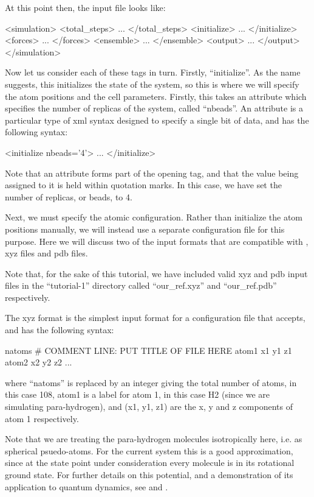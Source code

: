 \documentclass[11pt,english,fleqn]{report}
\newenvironment{code}{%
\footnotesize 
\verbatim
}{
\endverbatim
\normalsize
}
\begin{document}
At this point then, the input file looks like:

\begin{code}
<simulation>
   <total_steps>
      ...
   </total_steps>
   <initialize>
      ...
   </initialize>
   <forces>
      ...
   </forces>
   <ensemble>
      ...
   </ensemble>
   <output>
      ...
   </output>
</simulation>
\end{code}

Now let us consider each of these tags in turn. Firstly, {}``initialize''.
As the name suggests, this initializes the state of the system, so
this is where we will specify the atom positions and the cell
parameters. Firstly, this takes an attribute which specifies the number
of replicas of the system, called {}``nbeads''. An attribute is
a particular type of xml syntax designed to specify a single bit of
data, and has the following syntax:

\begin{code}
<initialize nbeads='4'>
   ...
</initialize>
\end{code}

Note that an attribute forms part of the opening tag, and that the
value being assigned to it is held within quotation marks. In this
case, we have set the number of replicas, or beads, to 4.

Next, we must specify the atomic configuration. Rather than initialize
the atom positions manually, we will instead use a separate configuration 
file for this purpose.
Here we will discuss two of the input formats that are compatible
with \ipi, xyz files and pdb files.

Note that, for the sake of this tutorial, we have included valid xyz and pdb input
files in the {}``tutorial-1'' directory called {}``our\_ref.xyz''
and {}``our\_ref.pdb'' respectively.

The xyz format is the simplest input format
for a configuration file that \ipi accepts, and has the following
syntax:

\begin{code}
natoms
# COMMENT LINE: PUT TITLE OF FILE HERE
atom1   x1  y1  z1
atom2   x2  y2  z2
...
\end{code}
where {}``natoms'' is replaced by an integer giving the total number
of atoms, in this case 108, atom1 is a label for atom 1, in this case
H2 (since we are simulating para-hydrogen), and (x1, y1, z1) are the
x, y and z components of atom 1 respectively. 

Note that we are treating the para-hydrogen molecules isotropically here,
i.e. as spherical psuedo-atoms.
For the current system this is a good approximation, since at 
the state point under consideration every molecule is in its 
rotational ground state. For further details on this potential,
and a demonstration of its application to quantum dynamics, see
\cite{silv-gold78jcp} and \cite{mill-mano05jcp}.
\end{document}
